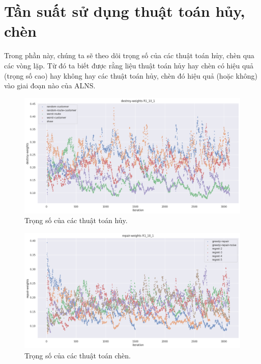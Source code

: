 \section{Tần suất sử dụng thuật toán hủy, chèn}

Trong phần này, chúng ta sẽ theo dõi trọng số của các thuật toán hủy, chèn qua các vòng lặp. Từ đó ta biết được rằng liệu thuật toán hủy hay chèn có hiệu quả (trọng số cao) hay không hay các thuật toán hủy, chèn đó hiệu quả (hoặc không) vào giai đoạn nào của ALNS.
 
\begin{figure}[H] %
	\centering %
	\includegraphics[width=1\textwidth]{figures/destroy_weights_R1_10_1.png}
	\caption{Trọng số của các thuật toán hủy.}
	\label{fig:alg_01}
\end{figure}

\begin{figure}[H] %
	\centering %
	\includegraphics[width=1\textwidth]{figures/repair_weights_R1_10_1.png}
	\caption{Trọng số của các thuật toán chèn.}
	\label{fig:alg_02}
\end{figure}

